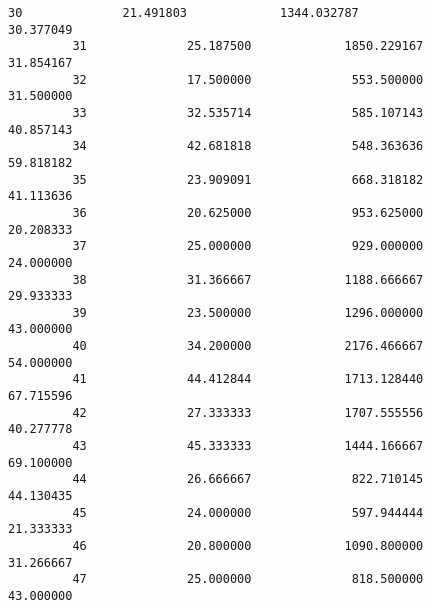 \documentclass[11pt]{article}
\begin{document}
\begin{Verbatim}[commandchars=\\\{\}]
         30              21.491803             1344.032787              30.377049   
         31              25.187500             1850.229167              31.854167   
         32              17.500000              553.500000              31.500000   
         33              32.535714              585.107143              40.857143   
         34              42.681818              548.363636              59.818182   
         35              23.909091              668.318182              41.113636   
         36              20.625000              953.625000              20.208333   
         37              25.000000              929.000000              24.000000   
         38              31.366667             1188.666667              29.933333   
         39              23.500000             1296.000000              43.000000   
         40              34.200000             2176.466667              54.000000   
         41              44.412844             1713.128440              67.715596   
         42              27.333333             1707.555556              40.277778   
         43              45.333333             1444.166667              69.100000   
         44              26.666667              822.710145              44.130435   
         45              24.000000              597.944444              21.333333   
         46              20.800000             1090.800000              31.266667   
         47              25.000000              818.500000              43.000000   
         

\end{Verbatim}
\end{document}
